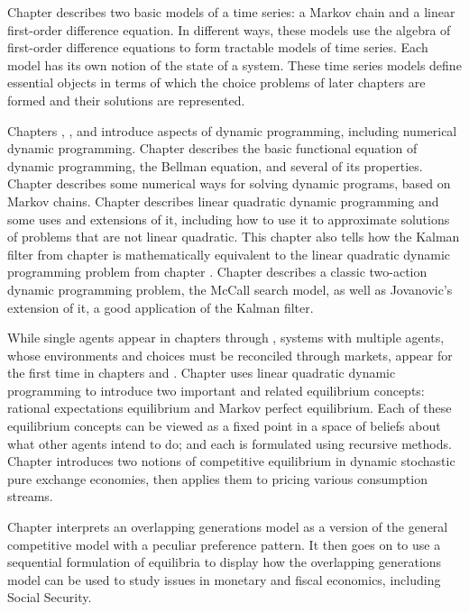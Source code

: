 Chapter  describes   two basic models of a time series:
a Markov chain and  a linear first-order difference equation.
In different ways, these models use the algebra of first-order
difference equations
to form tractable models of time series.  Each model
has its own notion of the state of a system.  These time
series models define essential   objects in terms of which
the choice problems of later chapters are formed and their
solutions are represented.

  Chapters , , and 
  introduce aspects of dynamic programming, including
numerical dynamic programming. Chapter  describes the
basic functional equation of dynamic programming, the Bellman
equation, and several of its properties. Chapter 
describes some numerical ways for solving dynamic programs, based
on Markov chains.  Chapter  describes linear
quadratic dynamic programming and some uses and extensions of it,
including how to use it to approximate solutions of problems that
are not linear quadratic. This chapter also tells how the Kalman
filter from chapter  is
mathematically equivalent to the linear quadratic dynamic
programming problem from chapter . Chapter 
describes a classic two-action dynamic programming problem, the
McCall search model, as well as Jovanovic's extension of it, a
good application of  the Kalman filter.

  While single agents appear in   chapters   through
,
systems with multiple agents, whose environments  and choices must
be reconciled through markets,  appear for the first time
in chapters  and .
 Chapter  uses linear quadratic dynamic
programming to introduce two important and related equilibrium concepts:
 rational expectations equilibrium and  Markov perfect
equilibrium.    Each of these equilibrium
concepts can be viewed as a fixed point in a space of beliefs
about what other agents intend to do;  and each    is
formulated using recursive methods.
Chapter  introduces two notions of competitive equilibrium
in dynamic stochastic pure exchange  economies, then applies
them to pricing various  consumption streams.

Chapter   interprets  an overlapping generations model
as a version of the general competitive  model with
a peculiar preference pattern.        It then goes on to
use a sequential formulation of equilibria to display
how the overlapping generations model can be used to study
issues in monetary and fiscal economics, including Social Security.

